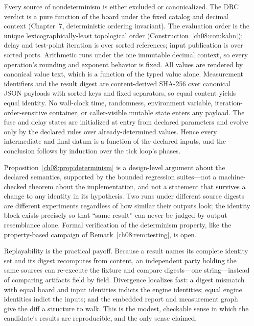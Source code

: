 \begin{designargument}
Every source of nondeterminism is either excluded or canonicalized. The DRC verdict is a pure function of the board under the fixed catalog and decimal context (Chapter~7, deterministic ordering invariant). The evaluation order is the unique lexicographically-least topological order (Construction~\ref{ch08:con:kahn}); delay and test-point iteration is over sorted references; input publication is over sorted ports. Arithmetic runs under the one immutable decimal context, so every operation's rounding and exponent behavior is fixed. All values are rendered by canonical value text, which is a function of the typed value alone. Measurement identifiers and the result digest are content-derived SHA-256 over canonical JSON payloads with sorted keys and fixed separators, so equal content yields equal identity. No wall-clock time, randomness, environment variable, iteration-order-sensitive container, or caller-visible mutable state enters any payload. The fuse and delay states are initialized at entry from declared parameters and evolve only by the declared rules over already-determined values. Hence every intermediate and final datum is a function of the declared inputs, and the conclusion follows by induction over the tick loop's phases.
\end{designargument}

\begin{remark}\label{ch08:rem:determinismscope}
Proposition~\ref{ch08:prop:determinism} is a design-level argument about the declared semantics, supported by the bounded regression suites---not a machine-checked theorem about the implementation, and not a statement that survives a change to any identity in its hypothesis. Two runs under different source digests are different experiments regardless of how similar their outputs look; the identity block exists precisely so that ``same result'' can never be judged by output resemblance alone. Formal verification of the determinism property, like the property-based campaign of Remark~\ref{ch08:rem:testing}, is open.
\end{remark}

Replayability is the practical payoff. Because a result names its complete identity set and its digest recomputes from content, an independent party holding the same sources can re-execute the fixture and compare digests---one string---instead of comparing artifacts field by field. Divergence localizes fast: a digest mismatch with equal board and input identities indicts the engine identities; equal engine identities indict the inputs; and the embedded report and measurement graph give the diff a structure to walk. This is the modest, checkable sense in which the candidate's results are reproducible, and the only sense claimed.

